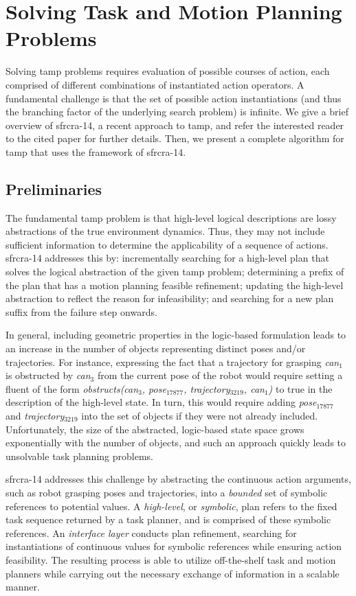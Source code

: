\section{Solving Task and Motion Planning Problems}
Solving {\sc tamp} problems requires evaluation of possible courses of
action, each comprised of different combinations of instantiated
action operators. A fundamental challenge is that the set of possible
action instantiations (and thus the branching factor of the underlying
search problem) is infinite.  We give a brief overview of {\sc
  sfrcra-14}, a recent approach to {\sc tamp}, and refer the
interested reader to the cited paper for further details.  Then, we
present a complete algorithm for {\sc tamp} that uses the framework of
{\sc sfrcra-14}.

\subsection{Preliminaries}
The fundamental {\sc tamp} problem is that high-level logical
descriptions are lossy abstractions of the true environment
dynamics. Thus, they may not include sufficient information to
determine the applicability of a sequence of actions.  {\sc sfrcra-14}
addresses this by: incrementally searching for a high-level plan that
solves the logical abstraction of the given {\sc tamp} problem;
determining a prefix of the plan that has a motion planning feasible
refinement; updating the high-level abstraction to reflect the reason
for infeasibility; and searching for a new plan suffix from the
failure step onwards.

In general, including geometric properties in the logic-based
formulation leads to an increase in the number of objects representing
distinct poses and/or trajectories. For instance, expressing the fact
that a trajectory for grasping \emph{can$_1$} is obstructed by
\emph{can$_3$} from the current pose of the robot would require
setting a fluent of the form \emph{obstructs(can$_3$, pose$_{17877}$,
  trajectory$_{3219}$, can$_1$)} to true in the description of the
high-level state. In turn, this would require adding
\emph{pose$_{17877}$} and \emph{trajectory$_{3219}$} into the set of
objects if they were not already included. Unfortunately, the size of
the abstracted, logic-based state space grows exponentially with the
number of objects, and such an approach quickly leads to unsolvable
task planning problems.

{\sc sfrcra-14} addresses this challenge by abstracting the continuous
action arguments, such as robot grasping poses and trajectories, into
a \emph{bounded} set of symbolic references to potential values. A
\emph{high-level}, or \emph{symbolic}, plan refers to the fixed task
sequence returned by a task planner, and is comprised of these symbolic
references. An \emph{interface layer} conducts plan refinement,
searching for instantiations of continuous values for symbolic
references while ensuring action feasibility.  The resulting process
is able to utilize off-the-shelf task and motion planners while
carrying out the necessary exchange of information in a scalable
manner.

